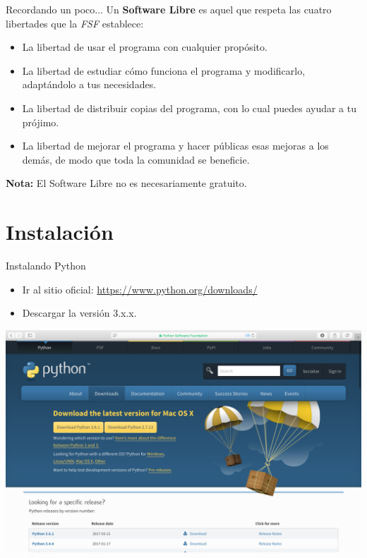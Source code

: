 \documentclass{beamer}
\begin{document}
  \begin{frame}{Recordando un poco...}
    Un \textbf{Software Libre} es aquel que respeta las cuatro libertades que
    la \textit{FSF} establece:
    \begin{itemize}
      \item La libertad de usar el programa con cualquier propósito.
      \item La libertad de estudiar cómo funciona el programa y modificarlo,
      adaptándolo a tus necesidades.
      \item La libertad de distribuir copias del programa, con lo cual puedes
      ayudar a tu prójimo.
      \item La libertad de mejorar el programa y hacer públicas esas mejoras a
      los demás, de modo que toda la comunidad se beneficie.
    \end{itemize}
    \textbf{Nota:} El Software Libre no es necesariamente gratuito.
  \end{frame}

  \section{Instalación}
  \begin{frame}{Instalando Python}
    \begin{itemize}
      \item Ir al sitio oficial: \url{https://www.python.org/downloads/}
      \item Descargar la versión 3.x.x.
    \end{itemize}
    \begin{center}
      \begin{tcolorbox}[beamer,
                  width=1.065\textheight,
                  arc=0pt,
                  boxsep=0pt,
                  left=0pt,right=0pt,top=0pt,bottom=0pt,
                  ]
        \includegraphics[scale=0.2]{imgs/download}
      \end{tcolorbox}
    \end{center}
  \end{frame}
\end{document}
